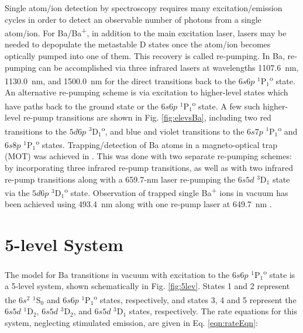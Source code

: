 

Single atom/ion detection by spectroscopy requires many excitation/emission cycles in order to detect an observable number of photons from a single atom/ion.  For Ba/Ba\textsuperscript{+}, in addition to the main excitation laser, lasers may be needed to depopulate the metastable D states once the atom/ion becomes optically pumped into one of them.  This recovery is called re-pumping.  In Ba, re-pumping can be accomplished via three infrared lasers at wavelengths 1107.6~nm, 1130.0~nm, and 1500.0~nm for the direct transitions back to the $6s6p$ $^{1}$P$_{1}$\textsuperscript{o} state.  An alternative re-pumping scheme is via excitation to higher-level states which have paths back to the ground state or the $6s6p$ $^{1}$P$_{1}$\textsuperscript{o} state.  A few such higher-level re-pump transitions are shown in Fig. \ref{fig:elevsBa}, including two red transitions to the $5d6p$ $^{3}$D$_{1}$\textsuperscript{o}, and blue and violet transitions to the $6s7p$ $^{1}$P$_{1}$\textsuperscript{o} and $6s8p$ $^{1}$P$_{1}$\textsuperscript{o} states.  Trapping/detection of Ba atoms in a magneto-optical trap (MOT) was achieved in \cite{BaMOT}.  This was done with two separate re-pumping schemes:  by incorporating three infrared re-pump transitions, as well as with two infrared re-pump transitions along with a 659.7-nm laser re-pumping the $6s5d$ $^{3}$D$_{1}$ state via the $5d6p$ $^{3}$D$_{1}$\textsuperscript{o} state.  Observation of trapped single Ba\textsuperscript{+} ions in vacuum has been achieved using 493.4~nm along with one re-pump laser at 649.7~nm \cite{BaPlus1978,singleBaPlusEXO}.


\section{5-level System}
\label{sec:model}

The model for Ba transitions in vacuum with excitation to the $6s6p$ $^{1}$P$_{1}$\textsuperscript{o} state is a 5-level system, shown schematically in Fig. \ref{fig:5lev}.  States 1 and 2 represent the $6s^{2}$ $^{1}$S$_{0}$ and $6s6p$ $^{1}$P$_{1}$\textsuperscript{o} states, respectively, and states 3, 4 and 5 represent the $6s5d$ $^{1}$D$_{2}$, $6s5d$ $^{3}$D$_{2}$, and $6s5d$ $^{3}$D$_{1}$ states, respectively.  The rate equations for this system, neglecting stimulated emission, are given in Eq. \ref{eqn:rateEqn}:


